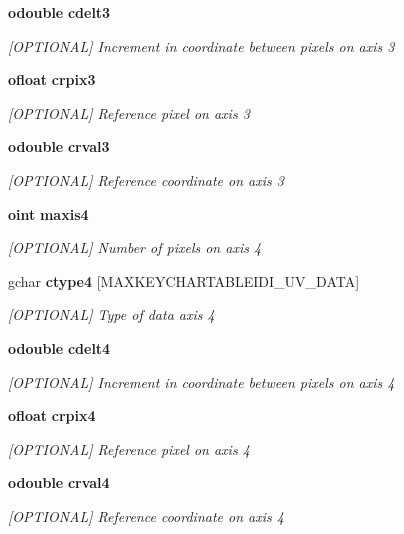 \begin{CompactItemize}
{\bf odouble} {\bf cdelt3}
\begin{CompactList}\small\item\em [OPTIONAL] Increment in coordinate between pixels on axis 3 \item\end{CompactList}\item 
{\bf ofloat} {\bf crpix3}
\begin{CompactList}\small\item\em [OPTIONAL] Reference pixel on axis 3 \item\end{CompactList}\item 
{\bf odouble} {\bf crval3}
\begin{CompactList}\small\item\em [OPTIONAL] Reference coordinate on axis 3 \item\end{CompactList}\item 
{\bf oint} {\bf maxis4}
\begin{CompactList}\small\item\em [OPTIONAL] Number of pixels on axis 4 \item\end{CompactList}\item 
gchar {\bf ctype4} [MAXKEYCHARTABLEIDI\_\-UV\_\-DATA]
\begin{CompactList}\small\item\em [OPTIONAL] Type of data axis 4 \item\end{CompactList}\item 
{\bf odouble} {\bf cdelt4}
\begin{CompactList}\small\item\em [OPTIONAL] Increment in coordinate between pixels on axis 4 \item\end{CompactList}\item 
{\bf ofloat} {\bf crpix4}
\begin{CompactList}\small\item\em [OPTIONAL] Reference pixel on axis 4 \item\end{CompactList}\item 
{\bf odouble} {\bf crval4}
\begin{CompactList}\small\item\em [OPTIONAL] Reference coordinate on axis 4 \item\end{CompactList}\item 

\end{CompactItemize}

